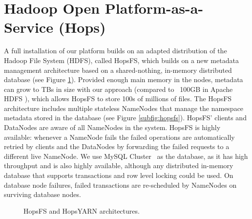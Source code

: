 
\section{Hadoop Open Platform-as-a-Service (Hops)}

A full installation of our platform builds on an adapted distribution of the Hadoop File System (HDFS), called HopsFS, which builds on a new metadata management architecture based on a shared-nothing, in-memory distributed database (see Figure \ref{fig:hops}). Provided enough main memory in the nodes, metadata can  grow to TBs in size with our approach (compared to  ~100GB in Apache HDFS \cite{shvachko2010Hdfs}), which allows HopsFS to store 100s of millions of files. The HopsFS architecture includes multiple stateless NameNodes that manage the namespace metadata stored in the database (see Figure \ref{subfig:hopsfs}). HopsFS' clients and DataNodes are aware of all NameNodes in the system. HopsFS is  highly available: whenever a NameNode fails the failed operations are automatically retried by clients and the DataNodes by forwarding the failed requests to a different live NameNode. We use MySQL Cluster~\cite{ronstrom2005recovery} as the database, as it has high throughput and is also highly available, although any distributed in-memory database that supports transactions and row level locking could be used. On database node failures, failed transactions are re-scheduled by NameNodes on surviving database nodes.

\begin{figure}[!ht]
    \hfill
    \caption{HopsFS and HopsYARN architectures.}
    \label{fig:hops}
\end{figure}
 

